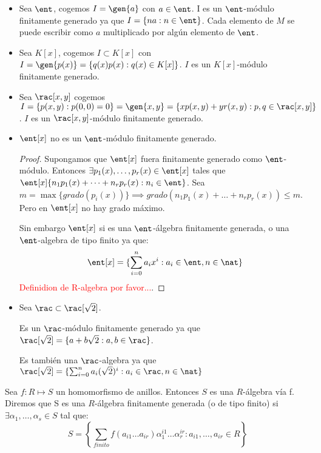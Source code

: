 \begin{example}
	\begin{itemize}
	\item Sea $\ent$, cogemos $I=\gen{a}$ con $a\in \ent$. I es un $\ent$-módulo finitamente generado ya que $I=\{na:n \in \ent \}$. Cada elemento de $M$ se puede escribir como $a$ multiplicado por algún elemento de $\ent$.
	\item Sea $K[x]$, cogemos $I \subset K[x]$ con $I=\gen{p(x)}=\{ q(x)p(x): q(x) \in K[x] \}$. $I$ es un $K[x]$-módulo finitamente generado.
	\item Sea $\rac[x,y]$ cogemos $I=\{ p(x,y):p(0,0)=0 \}=\gen{x,y}=\{ xp(x,y)+yr(x,y): p,q \in \rac[x,y] \}$. $I$ es un $\rac[x,y]$-módulo finitamente generado.
	\item $\ent[x]$ no es un $\ent$-módulo finitamente generado.
	
	\begin{proof}
		Supongamos que $\ent[x]$ fuera finitamente generado como $\ent$-módulo. Entonces $\exists p_1(x),\dots,p_r(x) \in \ent[x]$ tales que $\ent[x]\{ n_1p_1(x)+\dots+n_rp_r(x): n_i \in \ent \}$. Sea $m=\max\{grado(p_i(x)) \} \implies grado(n_1p_1(x)+\dots+n_rp_r(x)) \leq m$. Pero en $\ent[x]$ no hay grado máximo.
		
		Sin embargo $\ent[x]$ si es una $\ent$-álgebra finitamente generada, o una $\ent$-algebra de tipo finito ya que:
		$$ \ent[x]=\{ \sum_{i=0}^n a_i x^i: a_i \in \ent, n \in \nat \}$$ \textcolor{red}{Definidion de R-algebra por favor...}.
	\end{proof}
	\item Sea $\rac \subset \rac[\sqrt{2}]$.
	
	Es un $\rac$-módulo finitamente generado ya que $\rac[\sqrt{2}]=\{ a+b\sqrt{2}:a,b \in \rac \}$.
	
	Es también una $\rac$-algebra ya que $\rac[\sqrt{2}]=\{ \sum_{i=0}^n a_i(\sqrt{2})^i :a_i \in \rac, n \in \nat \}$
\end{itemize}
\end{example}

\begin{defn}
	Sea $f: R \longmapsto S$ un homomorfismo de anillos. Entonces $S$ es una $R$-álgebra vía f. Diremos que S es una $R$-álgebra finitamente generada (o de tipo finito) si $\exists \alpha_1,\dots, \alpha_s \in S$ tal que:
	$$ S=\left\{ \sum_{finito} f(a_{i1}\dots a_{ir})\alpha_1^{i1}\dots\alpha_r^{ir}: a_{i1},\dots, a_{ir} \in R \right\} $$
\end{defn}

